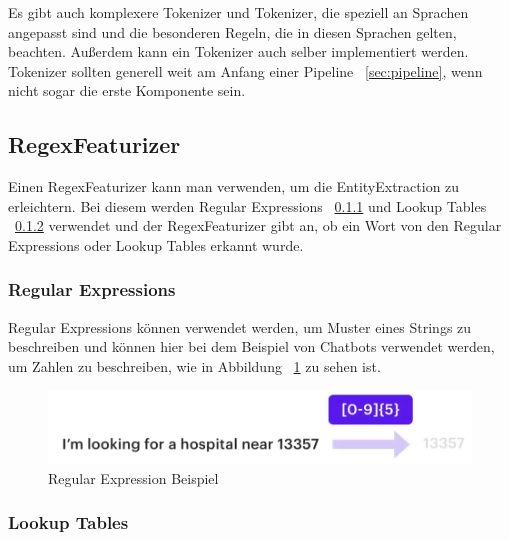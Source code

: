 Es gibt auch komplexere Tokenizer und Tokenizer, die speziell an Sprachen angepasst sind und die besonderen Regeln, die in diesen Sprachen gelten, beachten.
Außerdem kann ein Tokenizer auch selber implementiert werden.\cite{whitespaceTokenizer, rasaMasterclassWhitespaceTokenizer, pipelineComponentsYoutube}
Tokenizer sollten generell weit am Anfang einer Pipeline ~\ref{sec:pipeline}, wenn nicht sogar die erste Komponente sein.

\subsection{RegexFeaturizer}\label{subsec:regex-featurizer}

Einen RegexFeaturizer kann man verwenden, um die EntityExtraction zu erleichtern.
Bei diesem werden Regular Expressions ~\ref{subsubsec:regex-featurizer-regex} und Lookup Tables ~\ref{subsubsec:lookup-tables} verwendet und der RegexFeaturizer gibt an, ob ein Wort von den Regular Expressions oder Lookup Tables erkannt wurde.\cite{rasaMasterclassRegexFeaturizer, pipelineComponentsYoutube, regexFeaturizerCrf}

\subsubsection{Regular Expressions}\label{subsubsec:regex-featurizer-regex}

Regular Expressions können verwendet werden, um Muster eines Strings zu beschreiben und können hier bei dem Beispiel von Chatbots verwendet werden, um Zahlen zu beschreiben, wie in Abbildung ~\ref{fig:Regular Expression Beispiel} zu sehen ist.\cite{rasaMasterclassRegexFeaturizer, pipelineComponentsYoutube, regexFeaturizerCrf}

\begin{figure}[hbt!]
    \centering
    \includegraphics[scale=0.5]{pics/regular-expression-example}
    \caption{Regular Expression Beispiel~\cite{pipelineComponentsYoutube}}
    \label{fig:Regular Expression Beispiel}
\end{figure}

\subsubsection{Lookup Tables}\label{subsubsec:lookup-tables}

